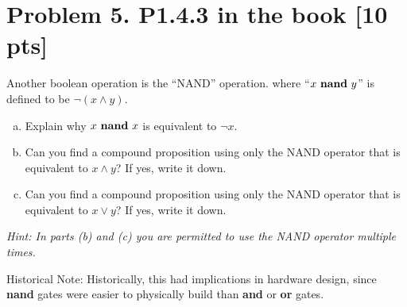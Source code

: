 \documentclass[12pt]{article}
\begin{document}
	\newpage
	\section*{\textbf{Problem 5. P1.4.3 in the book} [10 pts]}
	Another boolean operation is the ``NAND'' operation. where ``$x \ \mbox{\bf
	nand}\  y$'' is defined to be $\neg(x \wedge y).$
	\begin{enumerate}[(a)]
		\item Explain why $x \ \mbox{\bf nand}\  x$ is equivalent to $\neg x.$

		\item Can you find a compound proposition using only the NAND operator that is
			equivalent to $x \wedge y$? If yes, write it down.

		\item Can you find a compound proposition using only the NAND operator that is
			equivalent to $x \vee y$? If yes, write it down.
	\end{enumerate}
	{\em Hint: In parts (b) and (c) you are permitted to use the NAND operator multiple times. \par\noindent Historical Note: Historically, this had implications in hardware design, since {\bf nand} gates were easier to physically build than {\bf and} or {\bf or} gates.}
\end{document}
